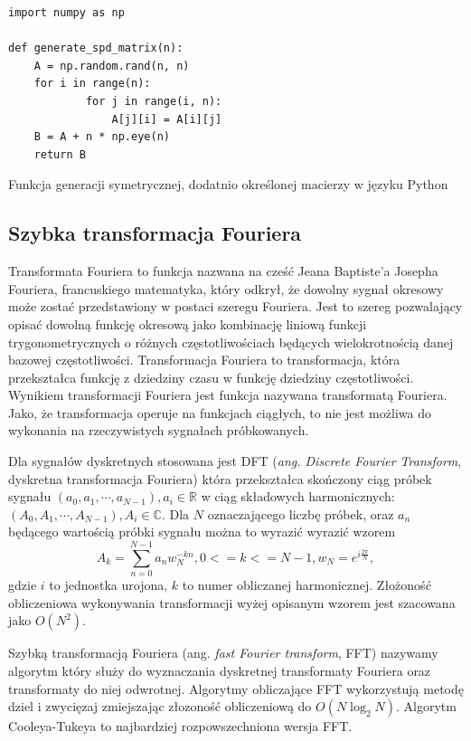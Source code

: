 \documentclass[a4paper,12pt]{book} %
\begin{document}
\begin{lstfloat}[H]
\lstset{language=Python}
\begin{lstlisting}[frame=single]
import numpy as np

def generate_spd_matrix(n):
	A = np.random.rand(n, n)
	for i in range(n):
    		for j in range(i, n):
        		A[j][i] = A[i][j]
	B = A + n * np.eye(n)
	return B
\end{lstlisting}
\caption{Funkcja generacji symetrycznej, dodatnio określonej macierzy w języku Python}
\label{lst:gen_spd_matrix}
\end{lstfloat}

\subsection{Szybka transformacja Fouriera}
Transformata Fouriera to funkcja nazwana na cześć Jeana Baptiste'a Josepha Fouriera, francuskiego matematyka, który odkrył, że dowolny sygnał okresowy może zostać przedstawiony w postaci szeregu Fouriera. Jest to szereg pozwalający opisać dowolną funkcję okresową jako kombinację liniową funkcji trygonometrycznych o różnych częstotliwościach będących wielokrotnością danej bazowej częstotliwości. Transformacja Fouriera to transformacja, która przekształca funkcję z dziedziny czasu w funkcję dziedziny częstotliwości. Wynikiem transformacji Fouriera jest funkcja nazywana transformatą Fouriera. Jako, że transformacja operuje na funkcjach ciągłych, to nie jest możliwa do wykonania na rzeczywistych sygnałach próbkowanych. 

Dla sygnałów dyskretnych stosowana jest DFT (\emph{ang. Discrete Fourier Transform}, dyskretna transformacja Fouriera) która przekształca skończony ciąg próbek sygnału $(a_0,a_1,\cdots,a_{N-1}), a_i \in \mathbb{R}$ w ciąg składowych harmonicznych: $(A_0,A_1,\cdots,A_{N-1}),A_i \in \mathbb{C}.$
Dla $N$ oznaczającego liczbę próbek, oraz $a_n$ będącego wartością próbki sygnału można to wyrazić wyrazić wzorem
$$A_k=\sum_{n=0}^{N-1}a_nw_N^{-kn}, 0 <= k <= N-1,
w_N = e^{i\frac{2\pi}{N}},$$
gdzie $i$ to jednostka urojona, $k$ to numer obliczanej harmonicznej. Złożoność obliczeniowa wykonywania transformacji wyżej opisanym wzorem jest szacowana jako $O(N^2)$.

Szybką transformacją Fouriera (ang. \emph{fast Fourier transform}, FFT) nazywamy algorytm który służy do wyznaczania dyskretnej transformaty Fouriera oraz transformaty do niej odwrotnej. Algorytmy obliczające FFT wykorzystują metodę dziel i zwycięzaj zmiejszając złozoność obliczeniową do $O(N\log_2N)$. Algorytm Cooleya-Tukeya to najbardziej rozpowszechniona wersja FFT.
\end{document}
